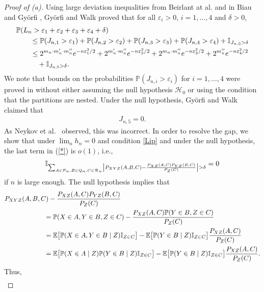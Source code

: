 \documentclass[11pt]{article}
\def\Q{Q}
\def\P{\mathcal{P}}
\def\PROB {{\mathbb P}}
\def\EXP {{\mathbb E}}
\def\IND{{\mathbb I}}
\begin{document}
\begin{proof}[Proof of (a)]
Using  large deviation inequalities from  Beirlant at al. \cite{BeDeGyVa01}
and in Biau and Gy\"orfi \cite{BiGy05},
Gy\"orfi and Walk \cite{GyWa12} proved that
 for all $\varepsilon_i>0$, $i=1,\dots ,4$ and $\delta>0$,
\begin{align}
\MoveEqLeft\PROB (L_n>\varepsilon_1+\varepsilon_2+\varepsilon_3+\varepsilon_4+\delta )\nonumber\\
&\le
\PROB (J_{n,1}>\varepsilon_1 )
+\PROB (J_{n,2}>\varepsilon_2 )
+\PROB (J_{n,3}>\varepsilon_3 )
+\PROB (J_{n,4}>\varepsilon_4 )
+\IND_{J_{n,5}>\delta}\nonumber\\
&\le
2^{m_n\cdot m'_n\cdot m''_n}e^{-n\varepsilon_1^2/2}
+2^{m'_n\cdot m''_n}e^{-n\varepsilon_2^2/2}
+2^{m_n\cdot m''_n}e^{-n\varepsilon_3^2/2}+2^{m''_n}e^{-n\varepsilon_4^2/2}\nonumber\\
&\quad +\IND_{ J_{n,5} >\delta}.
\label{*}
\end{align}
We note that  bounds on the probabilities $\PROB (J_{n,i}>\varepsilon_i )$ for $i=1,\ldots,4$ were proved   in  \cite{GyWa12} without either assuming the null hypothesis $\mathcal H_0$ or using the condition that the partitions are nested. 
Under the null hypothesis, Gy\"orfi and Walk \cite{GyWa12} claimed that
\begin{align*}
J_{n,5} =0.
\end{align*}
As Neykov et al.\ \cite{NeBaWa21} observed, this was incorrect. In order to resolve the gap, we show that under $\lim_n h_n=0$ and condition \eqref{Lip} and under the null hypothesis, the last term in (\ref{*}) is $o(1)$, i.e.,
\begin{align*}
\IND_{\sum_{A\in \P_n,B\in \Q_n,C\in {\cal R}_n}
\left|P_{XYZ}(A,B,C)-\frac{P_{XZ}(A,C)P_{YZ}(B,C)}{P_{Z}(C)}\right|   >\delta}=0
\end{align*}
if $n$ is large enough.
The null hypothesis implies that
\begin{align*}
\MoveEqLeft[6] P_{XYZ}(A,B,C)-\frac{P_{XZ}(A,C)P_{YZ}(B,C)}{P_{Z}(C)}\\
&=
\PROB(X\in A, Y\in B, Z\in C)-\frac{P_{XZ}(A,C)\PROB(Y\in B, Z\in C)}{P_{Z}(C)}\\
&=
\EXP\big[ \PROB(X\in A, Y\in B\mid Z)\IND_{Z\in C}\big] 
 -\EXP\big[\PROB(Y\in B\mid Z)\IND_{Z\in C}\big]\frac{P_{XZ}(A,C)  }{P_{Z}(C)}\\
&=
\EXP\big[ \PROB(X\in A\mid Z) \PROB(Y\in B\mid Z)\IND_{Z\in C}\big] 
-\EXP\big[\PROB(Y\in B\mid Z)\IND_{Z\in C}\big]\frac{P_{XZ}(A,C)  }{P_{Z}(C)}.
\end{align*}
Thus,
\begin{align*}

\end{align*}
\end{proof}
\end{document}
